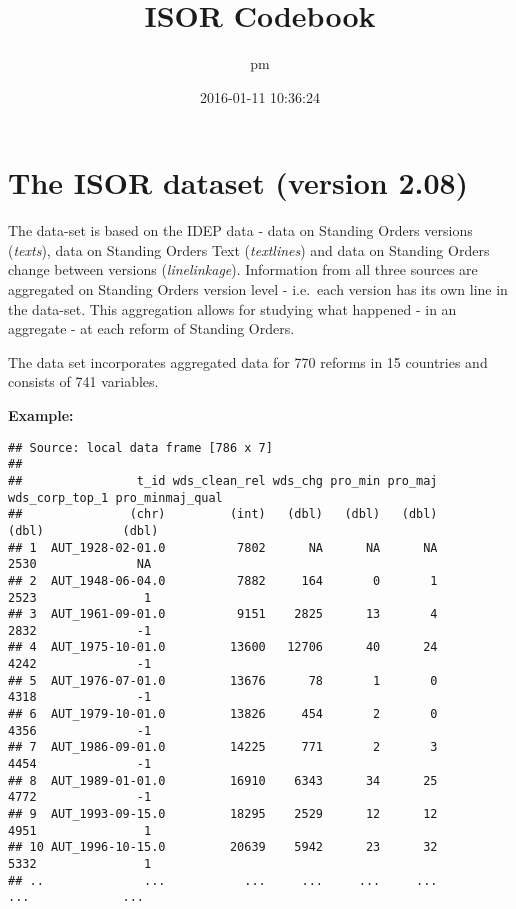 \documentclass[]{article}
\title{ISOR Codebook}
\author{pm}
\date{2016-01-11 10:36:24}
\newenvironment{Shaded}{\begin{snugshade}}{\end{snugshade}}
\newcommand{\KeywordTok}[1]{\textcolor[rgb]{0.13,0.29,0.53}{\textbf{{#1}}}}
\newcommand{\StringTok}[1]{\textcolor[rgb]{0.31,0.60,0.02}{{#1}}}
\newcommand{\NormalTok}[1]{{#1}}
\begin{document}
\maketitle

\section{The ISOR dataset (version
2.08)}\label{the-isor-dataset-version-2.08}

The data-set is based on the IDEP data - data on Standing Orders
versions (\emph{texts}), data on Standing Orders Text (\emph{textlines})
and data on Standing Orders change between versions
(\emph{linelinkage}). Information from all three sources are aggregated
on Standing Orders version level - i.e.~each version has its own line in
the data-set. This aggregation allows for studying what happened - in an
aggregate - at each reform of Standing Orders.

The data set incorporates aggregated data for 770 reforms in 15
countries and consists of 741 variables.

\textbf{Example:}

\begin{Shaded}
\end{Shaded}

\begin{verbatim}
## Source: local data frame [786 x 7]
## 
##                t_id wds_clean_rel wds_chg pro_min pro_maj wds_corp_top_1 pro_minmaj_qual
##               (chr)         (int)   (dbl)   (dbl)   (dbl)          (dbl)           (dbl)
## 1  AUT_1928-02-01.0          7802      NA      NA      NA           2530              NA
## 2  AUT_1948-06-04.0          7882     164       0       1           2523               1
## 3  AUT_1961-09-01.0          9151    2825      13       4           2832              -1
## 4  AUT_1975-10-01.0         13600   12706      40      24           4242              -1
## 5  AUT_1976-07-01.0         13676      78       1       0           4318              -1
## 6  AUT_1979-10-01.0         13826     454       2       0           4356              -1
## 7  AUT_1986-09-01.0         14225     771       2       3           4454              -1
## 8  AUT_1989-01-01.0         16910    6343      34      25           4772              -1
## 9  AUT_1993-09-15.0         18295    2529      12      12           4951               1
## 10 AUT_1996-10-15.0         20639    5942      23      32           5332               1
## ..              ...           ...     ...     ...     ...            ...             ...
\end{verbatim}
\end{document}
